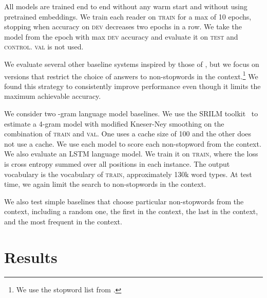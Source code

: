 \documentclass[11pt]{article}
\newcommand{\train}{\textsc{train}\xspace}
\newcommand{\val}{\textsc{val}\xspace}
\newcommand{\control}{\textsc{control}\xspace}
\newcommand{\dev}{\textsc{dev}\xspace}
\newcommand{\test}{\textsc{test}\xspace}
\newcommand{\ngram}{-gram\xspace}
\begin{document}
All models are trained end to end without any warm start and without using pretrained embeddings. 
We train each reader on \train for a max of 10 epochs, stopping when accuracy on \dev decreases two epochs in a row. We take the model from the epoch with max \dev accuracy and  evaluate it on \test and \control. \val is not used.

We evaluate several other baseline systems inspired by those of , but we focus on versions that restrict the choice of answers to non-stopwords in the context.\footnote{We use the stopword list from .}
We found this strategy to consistently improve performance even though it limits the maximum achievable accuracy. 

We consider two \ngram language model baselines. We use the SRILM toolkit~\cite{stolcke-02-srilm} to estimate a 4-gram model with modified Kneser-Ney smoothing on the combination of \train and \val. 
One uses a cache size of 100 and the other does not use a cache. We use each model to score each non-stopword from the context. 
We also evaluate an LSTM language model. 
We train it on \train, where the loss is cross entropy summed over all positions in each instance. The output vocabulary is the vocabulary of \train, approximately 130k word types. At test time, we again limit the search to non-stopwords in the context. 

We also test simple baselines that choose particular non-stopwords from the context, including a random one, the first in the context, the last in the context, and the most frequent in the context. 

\section{Results}
\end{document}
